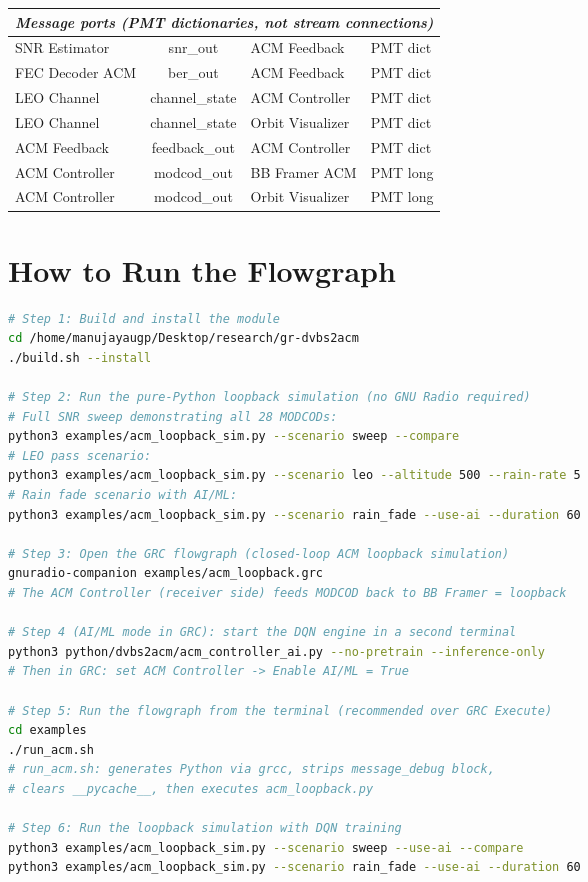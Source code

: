 \documentclass[12pt,a4paper]{report}
\begin{document}
\begin{table}[H]
\begin{tabular}{p{4.5cm}cp{4.5cm}l}
\midrule
\multicolumn{4}{l}{\textit{Message ports (PMT dictionaries, not stream connections)}} \\
\midrule
SNR Estimator      & snr\_out       & ACM Feedback        & PMT dict \\
FEC Decoder ACM    & ber\_out       & ACM Feedback        & PMT dict \\
LEO Channel        & channel\_state & ACM Controller      & PMT dict \\
LEO Channel        & channel\_state & Orbit Visualizer    & PMT dict \\
ACM Feedback       & feedback\_out  & ACM Controller      & PMT dict \\
ACM Controller     & modcod\_out    & BB Framer ACM       & PMT long \\
ACM Controller     & modcod\_out    & Orbit Visualizer    & PMT long \\
\bottomrule
\end{tabular}
\end{table}

\section{How to Run the Flowgraph}

\begin{lstlisting}[language=bash, caption={Build, simulate, and run the ACM loopback flowgraph}]
# Step 1: Build and install the module
cd /home/manujayaugp/Desktop/research/gr-dvbs2acm
./build.sh --install

# Step 2: Run the pure-Python loopback simulation (no GNU Radio required)
# Full SNR sweep demonstrating all 28 MODCODs:
python3 examples/acm_loopback_sim.py --scenario sweep --compare
# LEO pass scenario:
python3 examples/acm_loopback_sim.py --scenario leo --altitude 500 --rain-rate 5
# Rain fade scenario with AI/ML:
python3 examples/acm_loopback_sim.py --scenario rain_fade --use-ai --duration 60

# Step 3: Open the GRC flowgraph (closed-loop ACM loopback simulation)
gnuradio-companion examples/acm_loopback.grc
# The ACM Controller (receiver side) feeds MODCOD back to BB Framer = loopback

# Step 4 (AI/ML mode in GRC): start the DQN engine in a second terminal
python3 python/dvbs2acm/acm_controller_ai.py --no-pretrain --inference-only
# Then in GRC: set ACM Controller -> Enable AI/ML = True

# Step 5: Run the flowgraph from the terminal (recommended over GRC Execute)
cd examples
./run_acm.sh
# run_acm.sh: generates Python via grcc, strips message_debug block,
# clears __pycache__, then executes acm_loopback.py

# Step 6: Run the loopback simulation with DQN training
python3 examples/acm_loopback_sim.py --scenario sweep --use-ai --compare
python3 examples/acm_loopback_sim.py --scenario rain_fade --use-ai --duration 60
\end{lstlisting}
\end{document}
